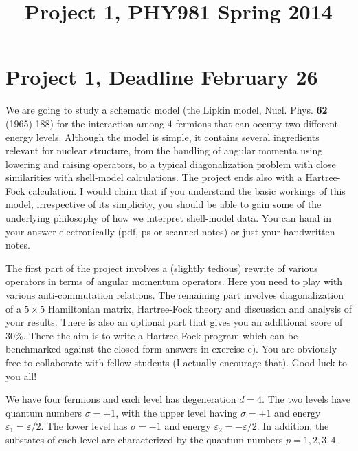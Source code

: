 \documentclass[11pt,a4wide]{article}
\begin{document}
\title{Project 1,  PHY981 Spring 2014}
\maketitle
\section*{Project 1, Deadline February 26}


We are going to study a schematic model (the Lipkin model, Nucl.
Phys. {\bf 62} (1965) 188) for the interaction among  $4$
fermions that can occupy two different energy levels. 
Although the model is simple, it contains several ingredients relevant for nuclear structure, from the handling
of angular momenta using lowering and raising operators, to  a typical diagonalization problem with close similarities
with shell-model calculations. The project ends also with a Hartree-Fock calculation. 
I would claim that if you understand the basic workings of this model, irrespective of its simplicity, you 
should be able to gain some of the underlying philosophy of how we interpret shell-model data.  
You can hand in your answer electronically (pdf, ps or scanned notes) or just your handwritten notes. 

The first part of the project involves a (slightly tedious) rewrite of various operators in terms of angular momentum 
operators. Here you need to play with various anti-commutation relations. The remaining part involves diagonalization of a $5\times 5$ Hamiltonian matrix, Hartree-Fock theory and discussion and analysis of your results.
There is also an optional part that gives you an additional score of 30\%. There the aim is to write a Hartree-Fock program which can be benchmarked against the closed form answers in exercise e). 
You are obviously free to collaborate with fellow students (I actually encourage that).  Good luck to you all! 

We have four fermions and 
each level has degeneration $d=4$. The two levels have quantum numbers $\sigma=\pm 1$,
with the upper level having  $\sigma=+1$ and energy
$\varepsilon_{1}=
\varepsilon/2$. The lower level  has $\sigma=-1$ and energy
$\varepsilon_{2}=-\varepsilon/2$. 
In addition, the substates  of each level are characterized  
by the quantum numbers $p=1,2,3,4$.  
\end{document}
